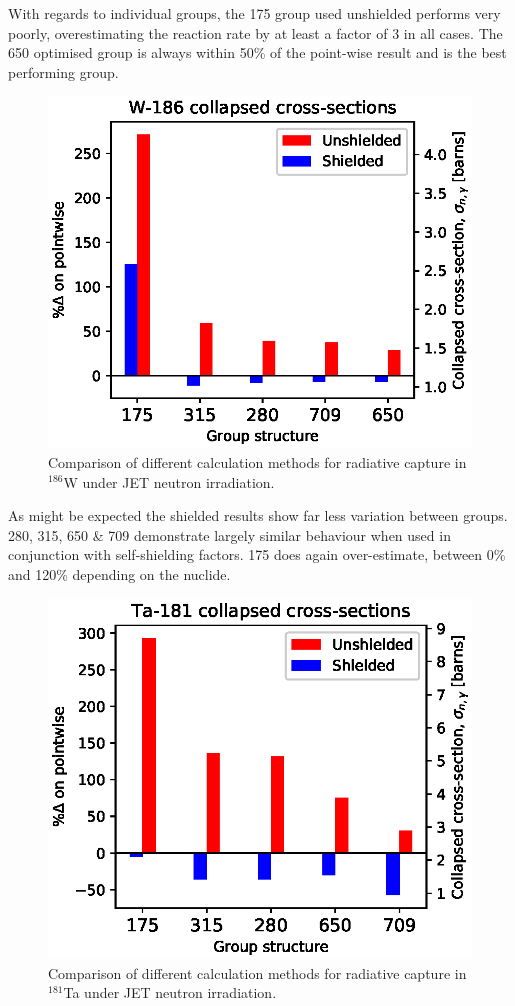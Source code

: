 With regards to individual groups, the 175 group used unshielded performs very poorly, overestimating the reaction rate by at least a factor of 3 in all cases. The 650 optimised group is always within 50\% of the point-wise result and is the best performing group.

\begin{figure}[h]
\centering
\includegraphics[width=\linewidth]{W-186.eps}
\caption{Comparison of different calculation methods for radiative capture in $^{186}$W under JET neutron irradiation.}
\label{fig:tungsten-186}
\end{figure}

As might be expected the shielded results show far less variation between groups. 280, 315, 650 \& 709 demonstrate largely similar behaviour when used in conjunction with self-shielding factors. 175 does again over-estimate, between 0\% and 120\% depending on the nuclide.

\begin{figure}[h]
\centering
\includegraphics[width=\linewidth]{Ta-181.eps}
\caption{Comparison of different calculation methods for radiative capture in $^{181}$Ta under JET neutron irradiation.}
\label{fig:tantalum-181}
\end{figure}

